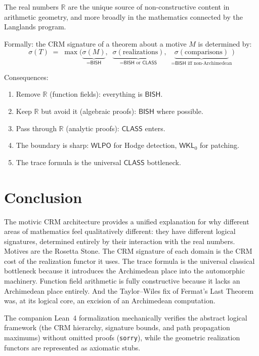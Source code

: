 \documentclass[11pt,a4paper]{article}
\theoremstyle{plain}
\theoremstyle{definition}
\newcommand{\BISH}{\textsf{BISH}}
\newcommand{\WKL}{\textsf{WKL}_0}
\newcommand{\WLPO}{\textsf{WLPO}}
\newcommand{\CLASS}{\textsf{CLASS}}
\newcommand{\sig}{\sigma}
\newcommand{\R}{\mathbb{R}}
\begin{document}
\begin{tcolorbox}[colback=blue!5!white, colframe=blue!60!black, title=\textbf{The Archimedean Thesis}]
The real numbers $\R$ are the unique source of non-constructive content in arithmetic geometry, and more broadly in the mathematics connected by the Langlands program.

Formally: the CRM signature of a theorem about a motive $M$ is determined by:
\[
\sig(T) \;=\; \max\bigl(\underbrace{\sig(M)}_{= \BISH},\;\; \underbrace{\sig(\text{realizations})}_{= \BISH \text{ or } \CLASS},\;\; \underbrace{\sig(\text{comparisons})}_{= \BISH \text{ iff non-Archimedean}}\bigr)
\]

Consequences:
\begin{enumerate}[label=(\arabic*)]
\item Remove $\R$ (function fields): everything is $\BISH$.
\item Keep $\R$ but avoid it (algebraic proofs): $\BISH$ where possible.
\item Pass through $\R$ (analytic proofs): $\CLASS$ enters.
\item The boundary is sharp: $\WLPO$ for Hodge detection, $\WKL$ for patching.
\item The trace formula is the universal $\CLASS$ bottleneck.
\end{enumerate}
\end{tcolorbox}


\section{Conclusion}\label{sec:conclusion}

The motivic CRM architecture provides a unified explanation for why different areas of mathematics feel qualitatively different: they have different logical signatures, determined entirely by their interaction with the real numbers. Motives are the Rosetta Stone. The CRM signature of each domain is the CRM cost of the realization functor it uses. The trace formula is the universal classical bottleneck because it introduces the Archimedean place into the automorphic machinery. Function field arithmetic is fully constructive because it lacks an Archimedean place entirely. And the Taylor--Wiles fix of Fermat's Last Theorem was, at its logical core, an excision of an Archimedean computation.

The companion Lean~4 formalization mechanically verifies the abstract logical framework (the CRM hierarchy, signature bounds, and path propagation maximums) without omitted proofs (\texttt{sorry}), while the geometric realization functors are represented as axiomatic stubs.
\end{document}
